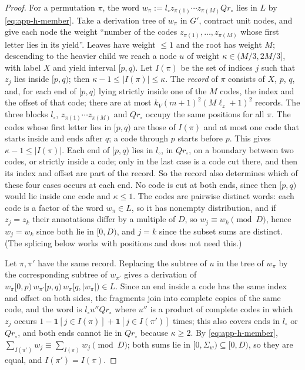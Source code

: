 \documentclass[11pt]{article}
\numberwithin{equation}{section}
\theoremstyle{plain}
\theoremstyle{definition}
\theoremstyle{remark}
\theoremstyle{plain}
\begin{document}
\begin{proof}
For a permutation $\pi$, the word $w_\pi:=l_\circ z_{\pi(1)}\cdots
z_{\pi(M)}Qr_\circ$ lies in $L$ by \eqref{eq:app-h-member}.  Take a
derivation tree of $w_\pi$ in $G'$, contract unit nodes, and give each node the
weight ``number of the codes $z_{\pi(1)},\ldots,z_{\pi(M)}$ whose first letter
lies in its yield''.  Leaves have weight $\le1$ and the root has weight $M$;
descending to the heavier child we reach a node $u$ of weight
$\kappa\in(M/3,2M/3]$, with label $X$ and yield interval $[p,q)$.  Let $I(\pi)$
be the set of indices $j$ such that $z_j$ lies inside $[p,q)$; then
$\kappa-1\le|I(\pi)|\le\kappa$.  The \emph{record} of $\pi$ consists of $X$,
$p$, $q$, and, for each end of $[p,q)$ lying strictly inside one of the $M$
codes, the index and the offset of that code; there are at most
$k_V(m+1)^2(M\ell_z+1)^2$ records.  The three blocks $l_\circ$, $z_{\pi(1)}\cdots
z_{\pi(M)}$ and $Qr_\circ$ occupy the same positions for all $\pi$.  The codes
whose first letter lies in $[p,q)$ are those of $I(\pi)$ and at most one code
that starts inside and ends after $q$; a code through $p$ starts before $p$.
This gives $\kappa-1\le|I(\pi)|$.  Each end of $[p,q)$ lies in $l_\circ$, in
$Qr_\circ$, on a boundary between two codes, or strictly inside a code; only in
the last case is a code cut there, and then its index and offset are part of the
record.  So the record also determines which of these four cases occurs at each
end.  No code is cut at both ends, since then $[p,q)$ would lie inside one code
and $\kappa\le1$.  The codes are pairwise distinct words: each code is a factor of the word
$w_\pi\in L$, so it has nonempty distribution, and if $z_j=z_k$ their
annotations differ by a multiple of $D$, so $w_j\equiv w_k\pmod D$, hence
$w_j=w_k$ since both lie in $[0,D)$, and $j=k$ since the subset sums are
distinct.  (The splicing below works with positions and does not need this.)

Let $\pi,\pi'$ have the same record.  Replacing the subtree of $u$ in the tree
of $w_\pi$ by the corresponding subtree of $w_{\pi'}$ gives a derivation of
$w_\pi[0,p)\,w_{\pi'}[p,q)\,w_\pi[q,|w_\pi|)\in L$.  Since an end inside a code
has the same index and offset on both sides, the fragments join into complete
copies of the same code, and the word is $l_\circ u''Qr_\circ$ where $u''$ is a
product of complete codes in which $z_j$ occurs
$1-\mathbf 1[j\in I(\pi)]+\mathbf 1[j\in I(\pi')]$ times; this also covers ends
in $l_\circ$ or $Qr_\circ$, and both ends cannot lie in $Qr_\circ$ because
$\kappa\ge2$.  By \eqref{eq:app-h-member},
$\sum_{I(\pi')}w_j\equiv\sum_{I(\pi)}w_j\pmod D$; both sums lie in
$[0,\Sigma_w)\subseteq[0,D)$, so they are equal, and $I(\pi')=I(\pi)$.


\end{proof}
\end{document}
